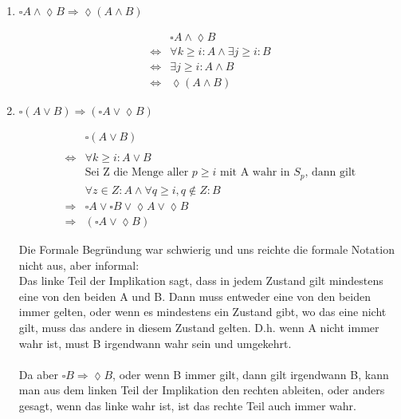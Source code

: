 \begin{enumerate}

\item $\square A \land \lozenge B \Rightarrow \lozenge (A \land B)$

\begin{align*}
	& \square A \land \lozenge B \\
	\Leftrightarrow  & \forall k \geq i: A \land \exists j \geq i: B \\
	\Leftrightarrow & \exists j \geq i: A \land B \tag{Da A für alle k $\geq$ i wahr ist, dann auch für j} \\
	\Leftrightarrow & \lozenge (A \land B) 
\end{align*}

\item $\square (A \lor B) \Rightarrow ( \square A \lor \lozenge B)$

\begin{align*}
	& \square (A \lor B) \\ \\
	\Leftrightarrow & \forall k \geq i: A \lor B \\
	 & \text{Sei Z die Menge aller } p \geq i \text{ mit A wahr in } S_p 
	 \text{, dann gilt} \\
	 & \forall z \in Z: A \land \forall q \geq i, q \not\in Z: B \\
	 \Rightarrow & \square A \lor \square B \lor \lozenge A \lor \lozenge B \\
	 \Rightarrow & (\square A \lor \lozenge B)
\end{align*}

Die Formale Begründung war schwierig und uns reichte die formale Notation nicht aus, aber informal: \\
Das linke Teil der Implikation sagt, dass in jedem Zustand gilt mindestens eine von den beiden A und B. Dann muss entweder eine von den beiden immer gelten, oder wenn es mindestens ein Zustand gibt, wo das eine nicht gilt, muss das andere in diesem Zustand gelten. D.h. wenn A nicht immer wahr ist, must B irgendwann wahr sein und umgekehrt. \\ \\
Da aber $\square B \Rightarrow \lozenge B$, oder wenn B immer gilt, dann gilt irgendwann B, kann man aus dem linken Teil der Implikation den rechten ableiten, oder anders gesagt, wenn das linke wahr ist, ist das rechte Teil auch immer wahr. \\ \\


\end{enumerate}
